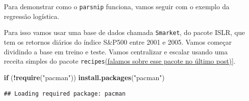 \documentclass[
]{article}
\newenvironment{Shaded}{\begin{snugshade}}{\end{snugshade}}
\newcommand{\ControlFlowTok}[1]{\textcolor[rgb]{0.13,0.29,0.53}{\textbf{#1}}}
\newcommand{\DataTypeTok}[1]{\textcolor[rgb]{0.13,0.29,0.53}{#1}}
\newcommand{\DecValTok}[1]{\textcolor[rgb]{0.00,0.00,0.81}{#1}}
\newcommand{\KeywordTok}[1]{\textcolor[rgb]{0.13,0.29,0.53}{\textbf{#1}}}
\newcommand{\NormalTok}[1]{#1}
\newcommand{\OperatorTok}[1]{\textcolor[rgb]{0.81,0.36,0.00}{\textbf{#1}}}
\newcommand{\OtherTok}[1]{\textcolor[rgb]{0.56,0.35,0.01}{#1}}
\newcommand{\StringTok}[1]{\textcolor[rgb]{0.31,0.60,0.02}{#1}}
\begin{document}
Para demonstrar como o \texttt{parsnip} funciona, vamos seguir com o
exemplo da regressão logística.

Para isso vamos usar uma base de dados chamada \texttt{Smarket}, do
pacote ISLR, que tem os retornos diários do índice S\&P500 entre 2001 e
2005. Vamos começar dividindo a base em treino e teste. Vamos
centralizar e escalar usando uma receita simples do pacote
\texttt{recipes}\href{(https://www.linkedin.com/pulse/pr\%C3\%A9-processamento-de-dados-r-com-o-pacote-recipes-edgar-cutar-junior/)}{(falamos
sobre esse pacote no último post)}{]}.

\begin{Shaded}
\begin{Highlighting}[]
\ControlFlowTok{if}\NormalTok{ (}\OperatorTok{!}\KeywordTok{require}\NormalTok{(}\StringTok{"pacman"}\NormalTok{)) }\KeywordTok{install.packages}\NormalTok{(}\StringTok{"pacman"}\NormalTok{)}
\end{Highlighting}
\end{Shaded}

\begin{verbatim}
## Loading required package: pacman
\end{verbatim}

\begin{Shaded}
\end{Shaded}
\end{document}
